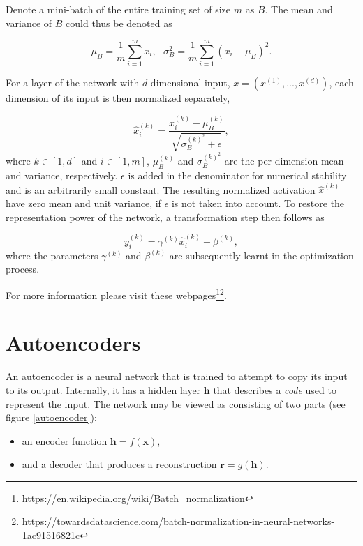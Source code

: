 \documentclass[12pt]{article}
\theoremstyle{plain}
\begin{document}
Denote a mini-batch of the entire training set of size $m$ as $B$. The mean and variance of $B$ could thus be denoted as

\begin{equation}
\mu_B = \frac{1}{m} \sum_{i=1}^m x_i,~~~ \sigma_B^2 = \frac{1}{m} \sum_{i=1}^m (x_i-\mu_B)^2.
\end{equation}

For a layer of the network with $d$-dimensional input, $x = (x^{(1)},...,x^{(d)})$, each dimension of its input is then normalized separately,

\begin{equation}
\hat{x}_{i}^{(k)} = \frac {x_i^{(k)}-\mu_B^{(k)}}{ \sqrt{\sigma_B^{(k)^2}+\epsilon}},
\end{equation}
where $k \in [1,d]$ and $i \in [1,m]$, $\mu_B^{(k)}$ and $\sigma_B^{(k)^2}$ are the per-dimension mean and variance, respectively. $\epsilon$ is added in the denominator for numerical stability and is an arbitrarily small constant. The resulting normalized activation $\hat{x}^{(k)}$ have zero mean and unit variance, if $\epsilon$ is not taken into account. To restore the representation power of the network, a transformation step then follows as

\begin{equation}
y_i^{(k)} = \gamma^{(k)} \hat{x}_{i}^{(k)} +\beta^{(k)},
\end{equation}
where the parameters $\gamma^{(k)}$ and $\beta^{(k)}$ are subsequently learnt in the optimization process.

For more information please visit these webpages\footnote{\url{https://en.wikipedia.org/wiki/Batch_normalization}}\footnote{\url{https://towardsdatascience.com/batch-normalization-in-neural-networks-1ac91516821c}}.

\section{Autoencoders}
An autoencoder is a neural network that is trained to attempt to copy its input to its output. Internally, it has a hidden layer $\mathbf{h}$ that describes a \textit{code} used to represent the input. The network may be viewed as consisting of two parts (see figure \ref{autoencoder}):

\begin{itemize}
	\item an encoder function $\mathbf{h} = f(\mathbf{x})$,
	\item and a decoder that produces a reconstruction $\mathbf{r} = g(\mathbf{h})$. 
\end{itemize}
\end{document}
